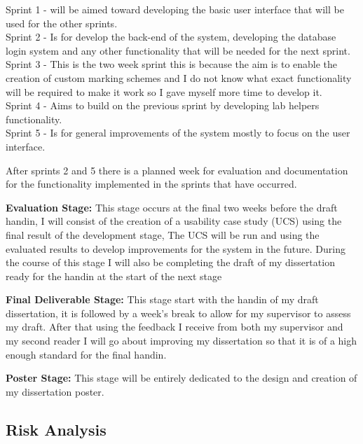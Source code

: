 \documentclass[12pt]{article}  %
\begin{document}
\noindent Sprint 1 - will be aimed toward developing the basic user interface that will be used for the other sprints.\\
Sprint 2 - Is for develop the back-end of the system, developing the database login system and any other functionality that will be needed for the next sprint.\\
Sprint 3 - This is the two week sprint this is because the aim is to enable the creation of custom marking schemes and I do not know what exact functionality will be required to make it work so I gave myself more time to develop it.\\
Sprint 4 - Aims to build on the previous sprint by developing lab helpers functionality.\\
Sprint 5 - Is for general improvements of the system mostly to focus on the user interface.

After sprints 2 and 5 there is a planned week for evaluation and documentation for the functionality implemented in the sprints that have occurred.\bigskip

\newpage
\noindent
\textbf{Evaluation Stage: } This stage occurs at the final two weeks before the draft handin, I will consist of the creation of a usability case study (UCS) using the final result of the development stage, The UCS will be run and using the evaluated results to develop improvements for the system in the future. During the course of this stage I will also be completing the draft of my dissertation ready for the handin at the start of the next stage\bigskip

\noindent
\textbf{Final Deliverable Stage:} This stage start with the handin of my draft dissertation, it is followed by a week's break to allow for my supervisor to assess my draft. After that using the feedback I receive from both my supervisor and my second reader I will go about improving my dissertation so that it is of a high enough standard for the final handin.\bigskip

\noindent
\textbf{Poster Stage:} This stage will be entirely dedicated to the design and creation of my dissertation poster.



\newpage
\subsection{Risk Analysis}
\end{document}
